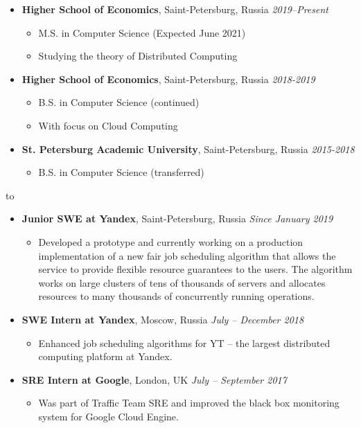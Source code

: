 \documentclass[10pt,a4paper]{extarticle}
\def\tbf{\textbf}
\def\lrg#1{\large\textbf{#1}\normalsize}
\def\headline#1{\medskip\hbox to \hsize{\hrulefill\quad\lower.3em\hbox{\lrg{#1}}\quad\hrulefill}\medskip}
\def\reslist{\vspace{-8pt}\begin{itemize}[label={},leftmargin=*]}
\def\endreslist{\end{itemize}\vspace{-5pt}}
\def\resRaw#1{
  \item #1\normalsize
  \vspace{-5pt}
}
\def\resLocTime#1#2#3{
  \resRaw {
    \tbf{#1}, #2 \hspace*{\fill} \textit{#3}
  }
}
\def\beginres{\begin{itemize}[label=\textbullet]}
\def\endres{\end{itemize}\vspace{-6pt}}
\def\subitem{\item}
\begin{document}
\reslist
  \resLocTime{Higher School of Economics} {Saint-Petersburg, Russia} {2019--Present}
  \beginres
    \subitem M.S. in Computer Science (Expected June 2021)
    \subitem Studying the theory of Distributed Computing
  \endres
  \resLocTime{Higher School of Economics} {Saint-Petersburg, Russia} {2018-2019}
  \beginres
    \subitem B.S. in Computer Science (continued)
    \subitem With focus on Cloud Computing
  \endres
  \resLocTime{St. Petersburg Academic University} {Saint-Petersburg, Russia} {2015-2018}
  \beginres
    \subitem B.S. in Computer Science (transferred)
  \endres
\endreslist

\headline{Work Experience}

\reslist
  \resLocTime{Junior SWE at Yandex} {Saint-Petersburg, Russia} {Since January 2019}
  \beginres
    \subitem
      Developed a prototype and currently working on a production implementation of a new
      fair job scheduling algorithm that allows the service to provide flexible resource guarantees to the users.
      The algorithm works on large clusters of tens of thousands of servers and allocates resources to many
      thousands of concurrently running operations.
  \endres

  \resLocTime{SWE Intern at Yandex} {Moscow, Russia} {July -- December 2018}
  \beginres
    \subitem Enhanced job scheduling algorithms for YT -- the largest distributed computing platform at Yandex.
  \endres

  \resLocTime{SRE Intern at Google} {London, UK} {July -- September 2017}
  \beginres
    \subitem Was part of Traffic Team SRE and improved the black box monitoring system for Google Cloud Engine.
  \endres
\endreslist

%
\end{document}
